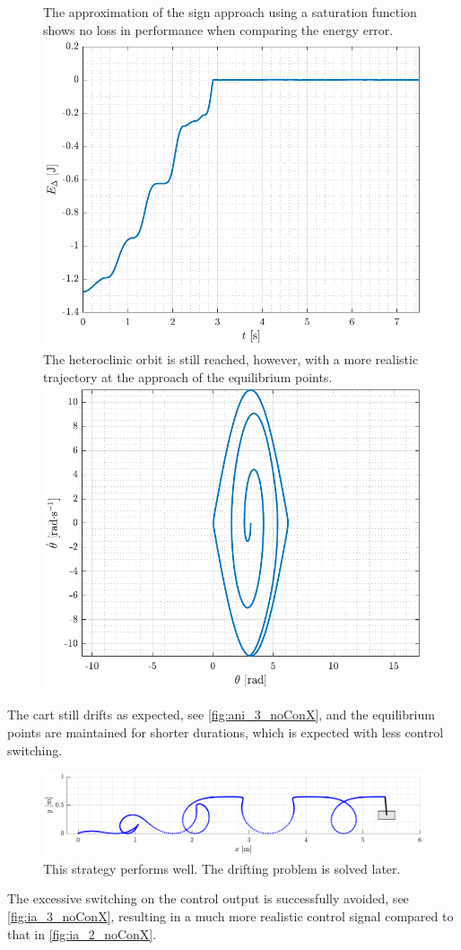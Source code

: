 \begin{figure}[H]
  \hspace{-10pt}
  \captionbox
  {
    The approximation of the sign approach using a saturation function shows no loss in performance when comparing the energy error.
    \label{fig:Edelta_3_noConX}
  }
  {
    \hspace{-1cm}
    \includegraphics[width=.46\textwidth]{figures/Edelta_3_noConX}
  }
  \hspace{20pt}
  \captionbox 
  {
    The heteroclinic orbit is still reached, however, with a more realistic trajectory at the approach of the equilibrium points.
    \label{fig:phase_3_noConX}
  }
  {
    \hspace{-1cm}
    \includegraphics[width=.46\textwidth]{figures/phase_3_noConX}
  }  
\end{figure}
%
The cart still drifts as expected, see \autoref{fig:ani_3_noConX}, and the equilibrium points are maintained for shorter durations, which is expected with less control switching.
%
\begin{figure}[H]
  \includegraphics[width=.7\textwidth]{figures/ani_3_noConX}
  \caption{This strategy performs well. The drifting problem is solved later.}
  \label{fig:ani_3_noConX}
\end{figure}
%
The excessive switching on the control output is successfully avoided, see \autoref{fig:ia_3_noConX}, resulting in a much more realistic control signal compared to that in \autoref{fig:ia_2_noConX}.
